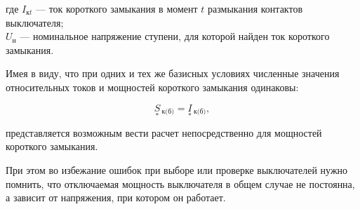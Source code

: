 где $ I_{\text{к}t} $ --- ток короткого замыкания в момент $ t $ размыкания контактов выключателя; \\
$ U_{\text{н}} $ --- номинальное напряжение ступени, для которой найден ток короткого замыкания.

Имея в виду, что при одних и тех же базисных условиях численные значения относительных токов и мощностей короткого замыкания одинаковы:

\begin{equation} %
	\label{eq:2-39 S_kz_baz_from_I_kz}
	\underset{*}{S}\!\,_{\text{к(б)}} = \underset{*}{I}\!\,_{\text{к(б)}},
\end{equation}

представляется возможным вести расчет непосредственно для мощностей короткого замыкания.

При этом во избежание ошибок при выборе или проверке выключателей нужно помнить, что отключаемая мощность выключателя в общем случае не постоянна, а зависит от напряжения, при котором он работает.


